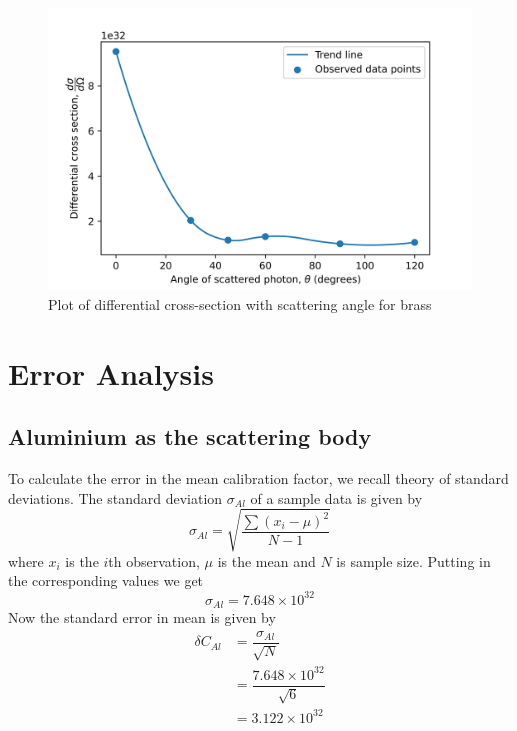\documentclass[%
 reprint,
nofootinbib,
 amsmath,amssymb,
 aps,
floatfix,
]{revtex4-2}
\begin{document}
    \begin{figure}
        \centering
        \includegraphics[scale = 0.56]{Figures/plot-brass-C.png}
        \caption{Plot of differential cross-section with scattering angle for brass}
        \label{fig:br-C}
    \end{figure}
    
\section{Error Analysis}
    \subsection{Aluminium as the scattering body}
    To calculate the error in the mean calibration factor, we recall theory of standard deviations. The standard deviation $\sigma_{Al}$ of a sample data is given by
    \begin{equation}
        \sigma_{Al} = \sqrt{\dfrac{\sum (x_i - \mu)^2}{N-1}}
    \end{equation}
    where $x_i$ is the $i$th observation, $\mu$ is the mean and $N$ is sample size. Putting in the corresponding values we get
    \begin{equation}
        \sigma_{Al} = 7.648 \times 10^{32}
    \end{equation}
    Now the standard error in mean is given by
    \begin{equation}
        \begin{split}
            \delta C_{Al} &= \dfrac{\sigma_{Al}}{\sqrt{N}} \\
            &= \dfrac{7.648 \times 10^{32}}{\sqrt{6}} \\
            &= \boxed{3.122 \times 10^{32}}
        \end{split}
    \end{equation}
\end{document}
